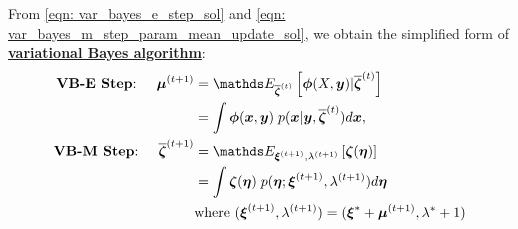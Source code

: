 \documentclass[11pt]{article}
\begin{document}
From \eqref{eqn: var_bayes_e_step_sol} and \eqref{eqn: var_bayes_m_step_param_mean_update_sol}, we obtain the simplified form of \underline{\textbf{variational Bayes algorithm}}:
\begin{align}
\text{\textbf{VB-E Step}: }\quad  \mb{\mu}^{(t+1)} &=  \E{\overline{\mb{\zeta}}^{(t)}}{\mb{\phi}(X, \mb{y})| \overline{\mb{\zeta}}^{(t)}} \nonumber\\
&= \int \mb{\phi}(\mb{x}, \mb{y})\; p(\mb{x}| \mb{y},  \overline{\mb{\zeta}}^{(t)}) d\mb{x},    \label{eqn: var_bayes_e_step_alt} \\
\text{\textbf{VB-M Step}: }\quad \overline{\mb{\zeta}}^{(t+1)} &= \E{\mb{\xi}^{(t+1)}, \lambda^{(t+1)}}{\mb{\zeta}(\mb{\eta})} \nonumber\\
&= \int  \mb{\zeta}(\mb{\eta}) \;p(\mb{\eta}; \mb{\xi}^{(t+1)}, \lambda^{(t+1)}) d\mb{\eta}  \label{eqn: var_bayes_m_step_alt} \\
&\text{where }(\mb{\xi}^{(t+1)}, \lambda^{(t+1)}) = (\mb{\xi}^{*} +\mb{\mu}^{(t+1)}  , \lambda^{*} + 1)  \nonumber
\end{align}


\newpage


\end{document}
